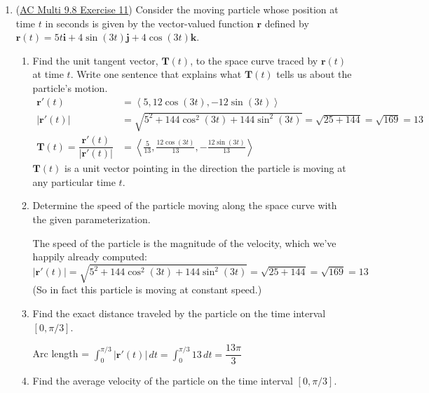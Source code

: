 \documentclass[10pt]{article}
\newcommand{\vi}{\mathbf{i}}
\newcommand{\vj}{\mathbf{j}}
\newcommand{\vk}{\mathbf{k}}
\newcommand{\vr}{\mathbf{r}}
\newcommand{\vT}{\mathbf{T}}
\newenvironment{red}{\color{red}}{\ignorespacesafterend}
\begin{document}
\begin{enumerate}[leftmargin=0pt]
\item (\href{https://activecalculus.org/multi/S-9-8-Arc-Length-Curvature.html#Ez_9_8_1}{AC Multi 9.8 Exercise 11}) Consider the moving particle whose position at time $t$ in seconds is given by the vector-valued function $\vr$ defined by $\vr(t) = 5t \vi + 4\sin(3t) \vj + 4\cos(3t) \vk$.
\begin{enumerate}
    \item Find the unit tangent vector, $\vT(t)$, to the space curve traced by $\vr(t)$ at time $t$. Write one sentence that explains what $\vT(t)$ tells us about the particle's motion.
    \begin{red}
        \begin{align*}
            \vr'(t) &= \left\langle 5, 12 \cos(3t), -12\sin(3t) \right\rangle\\
            |\vr'(t)| &= \sqrt{
                5^2 + 144 \cos^2(3t) + 144 \sin^2(3t) 
            }
            = \sqrt{25 + 144} = \sqrt{169} = 13 \\
            \vT(t) = \dfrac{\vr'(t)}{|\vr'(t)|} &= \left\langle
                \frac{5}{13},
                \frac{12\cos(3t)}{13},
                -\frac{12 \sin(3t)}{13}
            \right\rangle
        \end{align*}
        $\vT(t)$ is a unit vector pointing in the direction the particle is moving at any particular time $t$.
    \end{red}
    \item Determine the speed of the particle moving along the space curve with the given parameterization.
    
    \begin{red}
        The speed of the particle is the magnitude of the velocity, which we've happily already computed:
        \[ |\vr'(t)| = \sqrt{
            5^2 + 144 \cos^2(3t) + 144 \sin^2(3t) 
        }
        = \sqrt{25 + 144} = \sqrt{169} = 13 \]
        (So in fact this particle is moving at constant speed.)
    \end{red}
    \item Find the exact distance traveled by the particle on the time interval $[0, \pi/3]$.

    \begin{red}
        Arc length = $\displaystyle \int_0^{\pi/3} |\vr'(t)| \, dt
        = \int_0^{\pi/3} 13\, dt = \dfrac{13\pi}{3}$
    \end{red}
    \item Find the average velocity of the particle on the time interval $[0, \pi/3]$.


\end{enumerate}
\end{enumerate}
\end{document}

